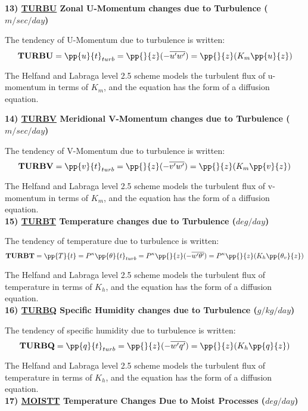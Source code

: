 \noindent
{\bf 13)  \underline {TURBU}  Zonal U-Momentum changes due to Turbulence ($m/sec/day$) }
 
\noindent
The tendency of U-Momentum due to turbulence is written:
\[
{\bf TURBU} = {\pp{u}{t}}_{turb} = {\pp{}{z} }{(- \overline{u^{\prime}w^{\prime}})}
 = {\pp{}{z} }{(K_m \pp{u}{z})}
\]

\noindent
The Helfand and Labraga level 2.5 scheme models the turbulent
flux of u-momentum in terms of $K_m$, and the equation has the form of a diffusion
equation.
 
\noindent
{\bf 14)  \underline {TURBV}  Meridional V-Momentum changes due to Turbulence ($m/sec/day$) }
 
\noindent
The tendency of V-Momentum due to turbulence is written:
\[
{\bf TURBV} = {\pp{v}{t}}_{turb} = {\pp{}{z} }{(- \overline{v^{\prime}w^{\prime}})}
 = {\pp{}{z} }{(K_m \pp{v}{z})}
\]

\noindent
The Helfand and Labraga level 2.5 scheme models the turbulent
flux of v-momentum in terms of $K_m$, and the equation has the form of a diffusion
equation.
\\
 
\noindent
{\bf 15)  \underline {TURBT}  Temperature changes due to Turbulence ($deg/day$) }
 
\noindent
The tendency of temperature due to turbulence is written:
\[
{\bf TURBT} = {\pp{T}{t}} = P^{\kappa}{\pp{\theta}{t}}_{turb} = 
P^{\kappa}{\pp{}{z} }{(- \overline{w^{\prime}\theta^{\prime}})}
 = P^{\kappa}{\pp{}{z} }{(K_h \pp{\theta_v}{z})}
\]

\noindent
The Helfand and Labraga level 2.5 scheme models the turbulent
flux of temperature in terms of $K_h$, and the equation has the form of a diffusion
equation.
\\
 
\noindent
{\bf 16)  \underline {TURBQ}  Specific Humidity changes due to Turbulence ($g/kg/day$) }
 
\noindent
The tendency of specific humidity due to turbulence is written:
\[
{\bf TURBQ} = {\pp{q}{t}}_{turb} = {\pp{}{z} }{(- \overline{w^{\prime}q^{\prime}})}
 = {\pp{}{z} }{(K_h \pp{q}{z})}
\]

\noindent
The Helfand and Labraga level 2.5 scheme models the turbulent
flux of temperature in terms of $K_h$, and the equation has the form of a diffusion
equation.
\\
 
\noindent
{\bf 17)  \underline {MOISTT} Temperature Changes Due to Moist Processes ($deg/day$) } 


